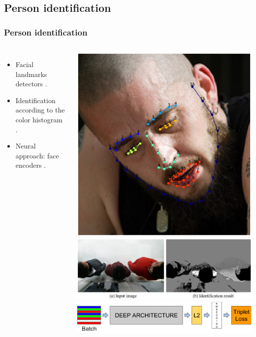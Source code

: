 \documentclass[11pt]{beamer}
\begin{document}
\subsection{Person identification}
\begin{frame}
	\frametitle{Person identification}
	\begin{columns}
		\begin{itemize}
			\item Facial landmarks detectors \cite{dlib_review}.
			\vspace{2cm}
			\item Identification according to the color histogram \cite{color_id}.
			\vspace{1cm}
			\item Neural approach: face encoders \cite{facenet}.
		\end{itemize}
		
		\begin{center}
			\includegraphics[width=0.45\linewidth]{dlib_landmarks} \\
			\vspace{0.2cm}
			\includegraphics[width=0.9\linewidth]{color_id} \\
			\vspace{0.4cm}
			\includegraphics[width=0.95\linewidth]{facenet} \\
			
		\end{center}
	\end{columns}
\end{frame}
\end{document}
